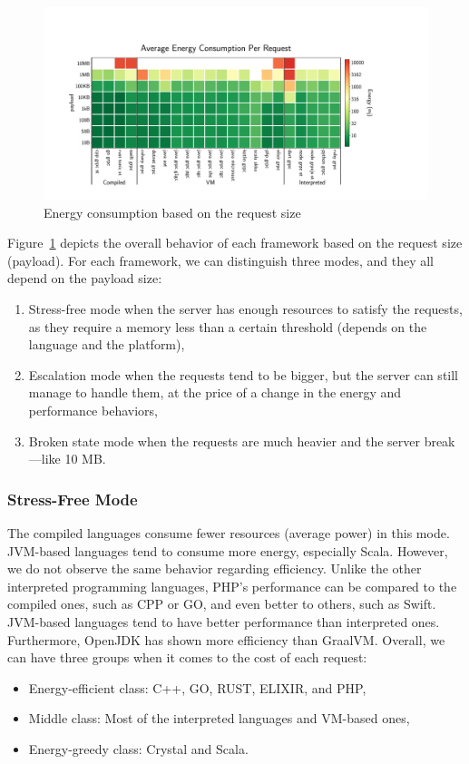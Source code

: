 \begin{figure}[!hbt]
    \begin{center}
        \includegraphics[width=1.2\linewidth]{imgs/energy_cost_payload}
    \end{center}
    \caption{Energy consumption based on the request size}\label{fig:energy_cost_payload}
\end{figure}
Figure~\ref{fig:energy_cost_payload} depicts the overall behavior of each framework based on the request size (payload).
For each framework, we can distinguish three modes, and they all depend on the payload size:
\begin{enumerate}
    \item \textsf{Stress-free} mode when the server has enough resources to satisfy the requests, as they require a memory less than a certain threshold (depends on the language and the platform),
    \item \textsf{Escalation} mode when the requests tend to be bigger, but the server can still manage to handle them, at the price of a change in the energy and performance behaviors,
    \item \textsf{Broken state} mode when the requests are much heavier and the server break—like 10 MB.%
\end{enumerate}

\subsubsection{Stress-Free Mode}
The compiled languages consume fewer resources (average power) in this mode.
JVM-based languages tend to consume more energy, especially Scala.
However, we do not observe the same behavior regarding efficiency.
Unlike the other interpreted programming languages, PHP's performance can be compared to the compiled ones, such as CPP or GO, and even better to others, such as Swift.
JVM-based languages tend to have better performance than interpreted ones.
Furthermore, OpenJDK has shown more efficiency than GraalVM.
Overall, we can have three groups when it comes to the cost of each request:
\begin{itemize}
    \item Energy-efficient class: C++, GO, RUST, ELIXIR, and PHP,
    \item Middle class: Most of the interpreted languages and VM-based ones,
    \item Energy-greedy class: Crystal and Scala.
\end{itemize}

